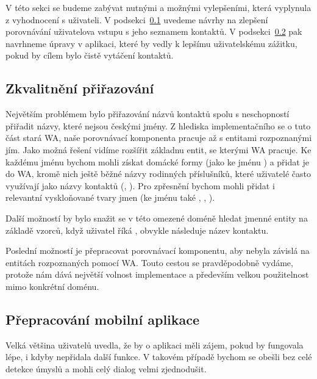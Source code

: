 V této sekci se budeme zabývat nutnými a možnými vylepšeními, která
vyplynula z vyhodnocení s uživateli. V podsekci~\ref{better-match}
uvedeme návrhy na zlepšení porovnávání uživatelova vstupu s jeho
seznamem kontaktů. V podsekci~\ref{better-app} pak navrhneme
úpravy v aplikaci, které by vedly k lepšímu uživatelskému
zážitku, pokud by cílem bylo čistě vytáčení kontaktů.

\subsection{Zkvalitnění přiřazování}\label{better-match}

Největším problémem bylo přiřazování názvů kontaktů spolu s neschopností přiřadit
názvy, které nejsou českými jmény. Z hlediska implementačního se o tuto část
stará WA, naše porovnávací komponenta pracuje až s entitami rozpoznanými jím.
Jako možná řešení vidíme rozšířit základnu entit, se kterými WA pracuje. Ke
každému jménu bychom mohli získat domácké formy (jako  ke jménu )
a přidat je do WA, kromě nich ještě běžné názvy rodinných příslušníků,
které uživatelé často využívají jako názvy kontaktů (, ).
Pro zpřesnění bychom mohli přidat i relevantní vyskloňované tvary jmen (ke jménu 
také , , ).

Další možností by bylo snažit se v této omezené doméně hledat jmenné entity na
základě vzorců, když uživatel říká , obvykle následuje název
kontaktu.

Poslední možností je přepracovat porovnávací komponentu, aby nebyla závislá
na entitách rozpoznaných pomocí WA. Touto cestou se pravděpodobně vydáme,
protože nám dává největší volnost implementace a především velkou
použitelnost mimo konkrétní doménu.

\subsection{Přepracování mobilní aplikace}\label{better-app}

Velká většina uživatelů uvedla, že by o aplikaci měli zájem, pokud by fungovala
lépe, i kdyby nepřidala další funkce. V takovém případě bychom se obešli
bez celé detekce úmyslů a mohli celý dialog velmi zjednodušit.

